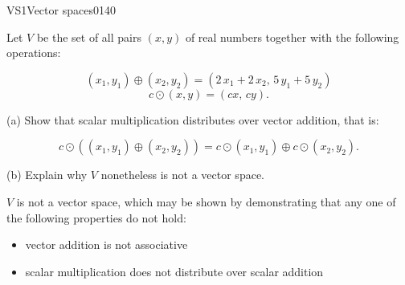 \begin{exercise}{VS1}{Vector spaces}{0140} 
\begin{exerciseStatement} 

 Let \(V\) be the set of all pairs \((x,y)\) of real numbers together with the following operations: 

 \[(x_1,y_1)\oplus (x_2,y_2)=\left(2 \, x_{1} + 2 \, x_{2},\,5 \, y_{1} + 5 \, y_{2}\right)\]\[c \odot (x,y) =\left(c x,\,c y\right).\] 

 (a) Show that scalar multiplication distributes over vector addition, that is: 

 \[
      c\odot \left((x_1,y_1)\oplus(x_2,y_2)\right)=c\odot(x_1,y_1)\oplus c\odot(x_2,y_2).
    \] 

 (b) Explain why \(V\) nonetheless is not a vector space. 

 \end{exerciseStatement}
 \begin{exerciseAnswer} 

 \(V\) is not a vector space, which may be shown by demonstrating that any one of the following properties do not hold: 

 

\begin{itemize}
\item vector addition is not associative
\item scalar multiplication does not distribute over scalar addition
\end{itemize}

     \end{exerciseAnswer}
 \end{exercise}


\newpage




